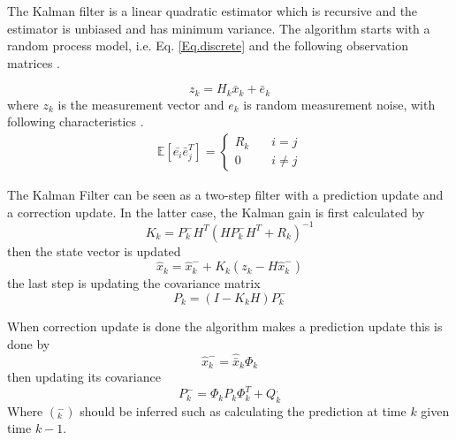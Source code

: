 The Kalman filter is a linear quadratic estimator which is recursive and the estimator is unbiased and has minimum variance. The algorithm starts with a random process model, i.e. Eq. \eqref{Eq.discrete} and the following observation matrices \cite{Discrete_kalman}.

\begin{equation}
z_k = H_k\bar{x}_k + \bar{e}_k
\end{equation}
where $z_k$ is the measurement vector and $e_k$ is random measurement noise, with following characteristics \cite{signal_process}.
\begin{align}
\mathbb{E}[\bar{e_i}\bar{e}_j^T] =
\begin{cases}
  R_k &\quad i=j\\    
  0 &\quad i\neq j   
\end{cases}
\end{align}

The Kalman Filter can be seen as a two-step filter with a prediction update and a correction update. In the latter case, the Kalman gain is first calculated by
\begin{equation}
K_k = P_k^-H^T(HP_k^-H^T+R_k)^{-1}
\end{equation}
then the state vector is updated
\begin{equation}
\hat{x}_k = \hat{x}_k^- + K_k(z_k-H\hat{x}_k^-)
\end{equation}
the last step is updating the covariance matrix
\begin{equation}
P_k = (I-K_kH)P_k^-
\end{equation}

When correction update is done the algorithm makes a prediction update this is done by 
\begin{equation}
\hat{x}_k^- = \hat{\bar{x}}_k\Phi_k
\end{equation}
then updating its covariance
\begin{equation}
P_k^- = \Phi_k P_k \Phi_k^T + Q_k^.
\end{equation}
Where $(_k^-)$ should be inferred such as calculating the prediction at time $k$ given time $k-1$.\\


